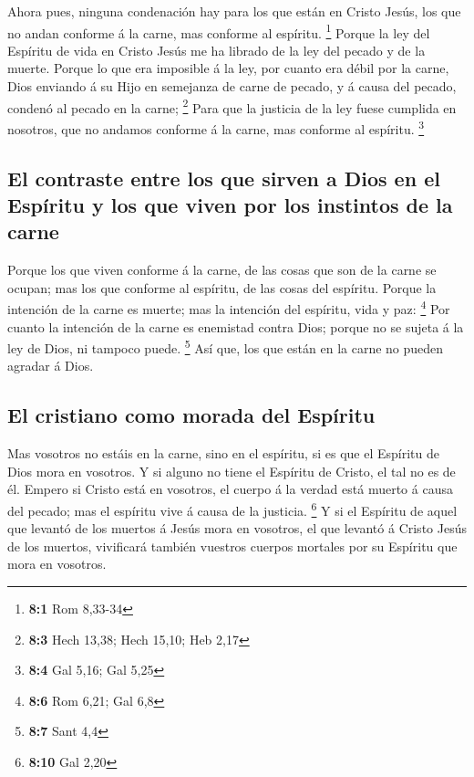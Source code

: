  Ahora pues, ninguna condenación hay para los que están en
Cristo Jesús, los que no andan conforme á la carne, mas conforme al
espíritu. \footnote{\textbf{8:1} Rom 8,33-34}  Porque la
ley del Espíritu de vida en Cristo Jesús me ha librado de la ley del
pecado y de la muerte.  Porque lo que era imposible á la
ley, por cuanto era débil por la carne, Dios enviando á su Hijo en
semejanza de carne de pecado, y á causa del pecado, condenó al pecado en
la carne; \footnote{\textbf{8:3} Hech 13,38; Hech 15,10; Heb 2,17}
 Para que la justicia de la ley fuese cumplida en
nosotros, que no andamos conforme á la carne, mas conforme al espíritu.
\footnote{\textbf{8:4} Gal 5,16; Gal 5,25}

\hypertarget{el-contraste-entre-los-que-sirven-a-dios-en-el-espuxedritu-y-los-que-viven-por-los-instintos-de-la-carne}{%
\subsection{El contraste entre los que sirven a Dios en el Espíritu y
los que viven por los instintos de la
carne}\label{el-contraste-entre-los-que-sirven-a-dios-en-el-espuxedritu-y-los-que-viven-por-los-instintos-de-la-carne}}

 Porque los que viven conforme á la carne, de las cosas
que son de la carne se ocupan; mas los que conforme al espíritu, de las
cosas del espíritu.  Porque la intención de la carne es
muerte; mas la intención del espíritu, vida y paz: \footnote{\textbf{8:6}
  Rom 6,21; Gal 6,8}  Por cuanto la intención de la carne
es enemistad contra Dios; porque no se sujeta á la ley de Dios, ni
tampoco puede. \footnote{\textbf{8:7} Sant 4,4}  Así que,
los que están en la carne no pueden agradar á Dios.

\hypertarget{el-cristiano-como-morada-del-espuxedritu}{%
\subsection{El cristiano como morada del
Espíritu}\label{el-cristiano-como-morada-del-espuxedritu}}

 Mas vosotros no estáis en la carne, sino en el espíritu,
si es que el Espíritu de Dios mora en vosotros. Y si alguno no tiene el
Espíritu de Cristo, el tal no es de él.  Empero si Cristo
está en vosotros, el cuerpo á la verdad está muerto á causa del pecado;
mas el espíritu vive á causa de la justicia. \footnote{\textbf{8:10} Gal
  2,20}  Y si el Espíritu de aquel que levantó de los
muertos á Jesús mora en vosotros, el que levantó á Cristo Jesús de los
muertos, vivificará también vuestros cuerpos mortales por su Espíritu
que mora en vosotros.

